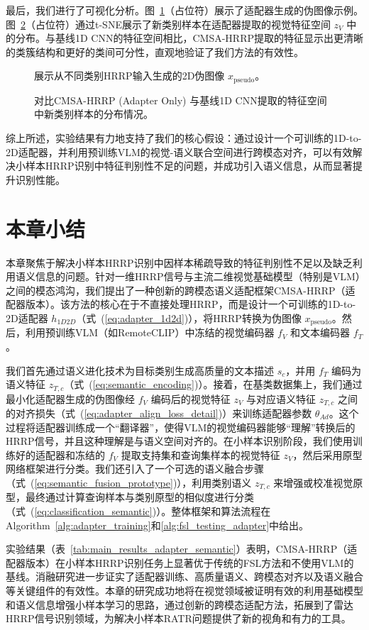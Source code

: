 最后，我们进行了可视化分析。图~\ref{fig:pseudo_images_semantic}（占位符）展示了适配器生成的伪图像示例。图~\ref{fig:tsne_adapter_semantic}（占位符）通过t-SNE展示了新类别样本在适配器提取的视觉特征空间 $z_V$ 中的分布。与基线1D CNN的特征空间相比，CMSA-HRRP提取的特征显示出更清晰的类簇结构和更好的类间可分性，直观地验证了我们方法的有效性。

\begin{figure}[h!]
    \centering
    \caption{展示从不同类别HRRP输入生成的2D伪图像 $x_{\text{pseudo}}$。}
    \label{fig:pseudo_images_semantic}
\end{figure}

\begin{figure}[h!]
    \centering
    \caption{对比CMSA-HRRP (Adapter Only) 与基线1D CNN提取的特征空间中新类别样本的分布情况。}
    \label{fig:tsne_adapter_semantic}
\end{figure}

综上所述，实验结果有力地支持了我们的核心假设：通过设计一个可训练的1D-to-2D适配器，并利用预训练VLM的视觉-语义联合空间进行跨模态对齐，可以有效解决小样本HRRP识别中特征判别性不足的问题，并成功引入语义信息，从而显著提升识别性能。

\section{本章小结}
\label{sec:semantic_summary}

本章聚焦于解决小样本HRRP识别中因样本稀疏导致的特征判别性不足以及缺乏利用语义信息的问题。针对一维HRRP信号与主流二维视觉基础模型（特别是VLM）之间的模态鸿沟，我们提出了一种创新的跨模态语义适配框架CMSA-HRRP（适配器版本）。该方法的核心在于不直接处理HRRP，而是设计一个可训练的1D-to-2D适配器 $h_{1D2D}$（式~(\ref{eq:adapter_1d2d})），将HRRP转换为伪图像 $x_{\text{pseudo}}$。然后，利用预训练VLM（如RemoteCLIP）中冻结的视觉编码器 $f_V$ 和文本编码器 $f_T$。

我们首先通过语义进化技术为目标类别生成高质量的文本描述 $s_c$，并用 $f_T$ 编码为语义特征 $z_{T,c}$（式~(\ref{eq:semantic_encoding})）。接着，在基类数据集上，我们通过最小化适配器生成的伪图像经 $f_V$ 编码后的视觉特征 $z_V$ 与对应语义特征 $z_{T,c}$ 之间的对齐损失（式~(\ref{eq:adapter_align_loss_detail})）来训练适配器参数 $\theta_{Ad}$。这个过程将适配器训练成一个“翻译器”，使得VLM的视觉编码器能够“理解”转换后的HRRP信号，并且这种理解是与语义空间对齐的。在小样本识别阶段，我们使用训练好的适配器和冻结的 $f_V$ 提取支持集和查询集样本的视觉特征 $z_V$，然后采用原型网络框架进行分类。我们还引入了一个可选的语义融合步骤（式~(\ref{eq:semantic_fusion_prototype})），利用类别语义 $z_{T,c}$ 来增强或校准视觉原型，最终通过计算查询样本与类别原型的相似度进行分类（式~(\ref{eq:classification_semantic})）。整体框架和算法流程在Algorithm~\ref{alg:adapter_training}和\ref{alg:fsl_testing_adapter}中给出。

实验结果（表~\ref{tab:main_results_adapter_semantic}）表明，CMSA-HRRP（适配器版本）在小样本HRRP识别任务上显著优于传统的FSL方法和不使用VLM的基线。消融研究进一步证实了适配器训练、高质量语义、跨模态对齐以及语义融合等关键组件的有效性。本章的研究成功地将在视觉领域被证明有效的利用基础模型和语义信息增强小样本学习的思路，通过创新的跨模态适配方法，拓展到了雷达HRRP信号识别领域，为解决小样本RATR问题提供了新的视角和有力的工具。
